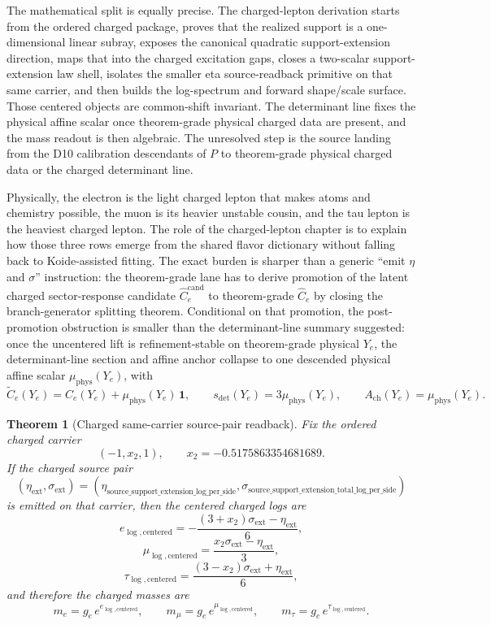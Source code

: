 \documentclass[11pt]{article}
\newtheorem{theorem}{Theorem}[section]
\begin{document}
The mathematical split is equally precise. The charged-lepton derivation starts from
the ordered charged package, proves that the realized support is a one-dimensional linear subray,
exposes the canonical quadratic support-extension direction, maps that into the charged
excitation gaps, closes a two-scalar support-extension law shell, isolates the smaller eta
source-readback primitive on that same carrier, and then builds the log-spectrum and forward
shape/scale surface. Those centered objects are common-shift invariant. The determinant line fixes the physical affine scalar once theorem-grade physical charged data are present, and the mass readout is then algebraic. The unresolved step is the source landing from the D10 calibration descendants of \(P\) to theorem-grade physical charged data or the charged determinant line.

Physically, the electron is the light charged lepton that makes atoms and chemistry possible, the
muon is its heavier unstable cousin, and the tau lepton is the heaviest charged lepton. The role
of the charged-lepton chapter is to explain how those three rows emerge from the shared flavor
dictionary without falling back to Koide-assisted fitting. The exact burden is sharper than a
generic ``emit \(\eta\) and \(\sigma\)'' instruction: the theorem-grade lane has to derive
promotion of the latent charged sector-response candidate
\(\widehat C_e^{\mathrm{cand}}\) to theorem-grade \(\widehat C_e\) by closing the branch-generator
splitting theorem. Conditional on that promotion, the post-promotion obstruction is smaller
than the determinant-line summary suggested: once the uncentered lift is refinement-stable
on theorem-grade physical \(Y_e\), the determinant-line section and affine anchor collapse to one
descended physical affine scalar \(\mu_{\mathrm{phys}}(Y_e)\), with
\[
\widetilde C_e(Y_e)=\widehat C_e(Y_e)+\mu_{\mathrm{phys}}(Y_e)\,\mathbf 1,
\qquad
s_{\det}(Y_e)=3\mu_{\mathrm{phys}}(Y_e),
\qquad
A_{\mathrm{ch}}(Y_e)=\mu_{\mathrm{phys}}(Y_e).
\]

\begin{theorem}[Charged same-carrier source-pair readback]
Fix the ordered charged carrier
\[
(-1,x_2,1),
\qquad
x_2=-0.5175863354681689.
\]
If the charged source pair
\[
(\eta_{\mathrm{ext}},\sigma_{\mathrm{ext}})
=
(\eta_{\mathrm{source\_support\_extension\_log\_per\_side}},
\sigma_{\mathrm{source\_support\_extension\_total\_log\_per\_side}})
\]
is emitted on that carrier, then the centered charged logs are
\[
e_{\log,\mathrm{centered}}
=
-\frac{(3+x_2)\sigma_{\mathrm{ext}}-\eta_{\mathrm{ext}}}{6},
\]
\[
\mu_{\log,\mathrm{centered}}
=
\frac{x_2\sigma_{\mathrm{ext}}-\eta_{\mathrm{ext}}}{3},
\]
\[
\tau_{\log,\mathrm{centered}}
=
\frac{(3-x_2)\sigma_{\mathrm{ext}}+\eta_{\mathrm{ext}}}{6},
\]
and therefore the charged masses are
\[
m_e = g_e\,e^{e_{\log,\mathrm{centered}}},
\qquad
m_\mu = g_e\,e^{\mu_{\log,\mathrm{centered}}},
\qquad
m_\tau = g_e\,e^{\tau_{\log,\mathrm{centered}}}.
\]
\end{theorem}
\end{document}
